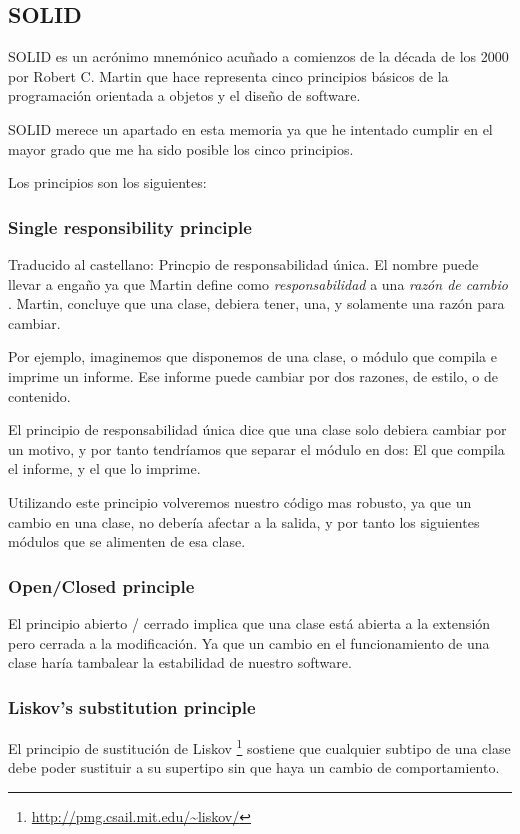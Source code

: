 \subsection{SOLID}
SOLID es un acr\'{o}nimo mnem\'{o}nico acu\~{n}ado a comienzos de la d\'{e}cada de los 2000 por Robert C. Martin \cite{bringhurst:elements} 
que hace representa cinco principios b\'{a}sicos de la programaci\'{o}n orientada a objetos y el dise\~{n}o de software.

SOLID merece un apartado en esta memoria ya que he intentado cumplir en el mayor grado que me ha sido posible los cinco principios.

Los principios son los siguientes:
\subsubsection{Single responsibility principle}
Traducido al castellano: Princpio de responsabilidad \'{u}nica. El nombre puede llevar a enga\~{n}o ya que Martin define como \emph{responsabilidad}
a una \emph{raz\'{o}n de cambio} \cite{brunetti-JMMM-2002}. Martin, concluye que una clase, debiera tener, una, y solamente una raz\'{o}n para cambiar.

Por ejemplo, imaginemos que disponemos de una clase, o m\'{o}dulo que compila e imprime un informe. Ese informe puede cambiar por dos razones,
de estilo, o de contenido. 

El principio de responsabilidad \'{u}nica dice que una clase solo debiera cambiar por un motivo, y por tanto tendr\'{i}amos que separar el m\'{o}dulo
en dos: El que compila el informe, y el que lo imprime.

Utilizando este principio volveremos nuestro c\'{o}digo mas robusto, ya que un cambio en una clase, no deber\'{i}a afectar a la salida, y por tanto
los siguientes m\'{o}dulos que se alimenten de esa clase.

\subsubsection{Open/Closed principle}
El principio abierto / cerrado implica que una clase est\'{a} abierta a la extensi\'{o}n pero cerrada a la modificaci\'{o}n. Ya que un cambio en el
funcionamiento de una clase har\'{i}a tambalear la estabilidad de nuestro software.

\subsubsection{Liskov's substitution principle}
El principio de sustituci\'{o}n de Liskov \footnote{\url{http://pmg.csail.mit.edu/~liskov/}} sostiene que cualquier subtipo de una clase
debe poder sustituir a su supertipo sin que haya un cambio de comportamiento.

